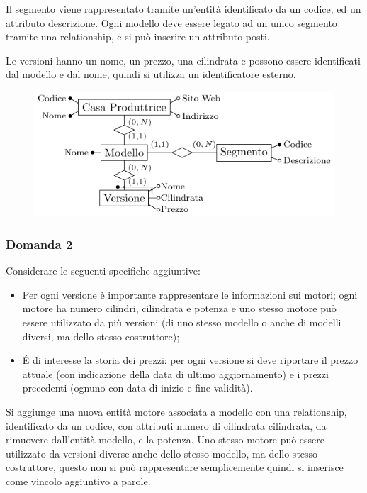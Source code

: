 \documentclass{article}
\begin{document}
Il segmento viene rappresentato tramite un'entità identificato da un codice, ed un attributo descrizione. Ogni modello deve essere legato ad un unico segmento tramite 
una relationship, e si può inserire un attributo posti. 

Le versioni hanno un nome, un prezzo, una cilindrata e possono essere identificati dal modello e dal nome, quindi si utilizza un identificatore esterno. 

\begin{figure}[H]%
    \centering%
    \includegraphics[scale=1.25,trim={0 1cm 0 0}]{schema_er_es_2.pdf}%
\end{figure}

\subsubsection*{Domanda 2}

Considerare le seguenti specifiche aggiuntive:
\begin{itemize}
    \item Per ogni versione è importante rappresentare le informazioni sui motori; ogni motore ha numero cilindri, cilindrata e potenza e uno stesso motore può essere 
utilizzato da più versioni (di uno stesso modello o anche di modelli diversi, ma dello stesso costruttore);
    \item \'{E} di interesse la storia dei prezzi: per ogni versione si deve riportare il prezzo attuale (con indicazione della data di ultimo aggiornamento) e i 
prezzi precedenti (ognuno con data di inizio e fine validità). 
\end{itemize}

Si aggiunge una nuova entità motore associata a modello con una relationship, identificato da un codice, con attributi numero di cilindrata cilindrata, da 
rimuovere dall'entità modello, e la potenza. Uno stesso motore può essere utilizzato da versioni diverse anche dello stesso modello, ma dello stesso costruttore, 
questo non si può rappresentare semplicemente quindi si inserisce come vincolo aggiuntivo a parole. 
\end{document}
